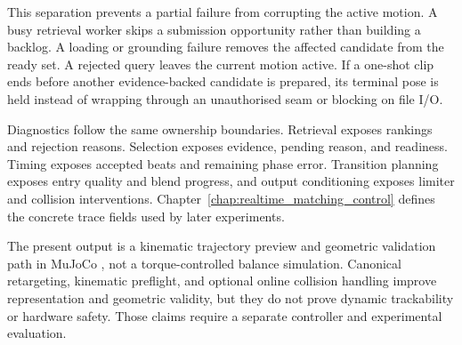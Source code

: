 This separation prevents a partial failure from corrupting the active motion.
A busy retrieval worker skips a submission opportunity rather than building a
backlog. A loading or grounding failure removes the affected candidate from the
ready set. A rejected query leaves the current motion active. If a one-shot
clip ends before another evidence-backed candidate is prepared, its terminal
pose is held instead of wrapping through an unauthorised seam or blocking on
file I/O.

Diagnostics follow the same ownership boundaries. Retrieval exposes rankings
and rejection reasons. Selection exposes evidence, pending reason, and
readiness. Timing exposes accepted beats and remaining phase error. Transition
planning exposes entry quality and blend progress, and output conditioning
exposes limiter and collision interventions. Chapter~\ref{chap:realtime_matching_control}
defines the concrete trace fields used by later experiments.

The present output is a kinematic trajectory preview and geometric validation
path in MuJoCo \cite{todorov2012mujoco}, not a torque-controlled balance
simulation. Canonical retargeting, kinematic preflight, and optional online
collision handling improve representation and geometric validity, but they do
not prove dynamic trackability or hardware safety. Those claims require a
separate controller and experimental evaluation.
